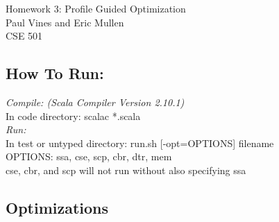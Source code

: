\documentclass[12pt,letterpaper]{article}
\begin{document}
\begin{flushright}
Homework 3: Profile Guided Optimization\\
Paul Vines and Eric Mullen\\
CSE 501\\
\end{flushright}

\subsection*{How To Run:}
\emph{Compile: (Scala Compiler Version 2.10.1)}\\
In code directory: scalac *.scala\\

\emph{Run:}\\
In test or untyped directory: run.sh [-opt=OPTIONS] filename\\
OPTIONS: ssa, cse, scp, cbr, dtr, mem\\
cse, cbr, and scp will not run without also specifying ssa\\


\subsection*{Optimizations}
\end{document}
